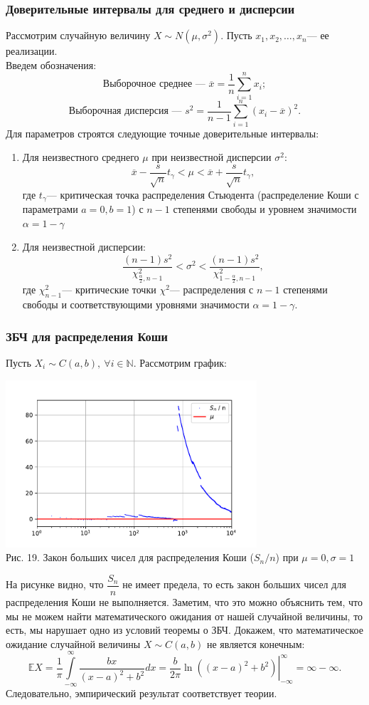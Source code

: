 \documentclass[11pt]{article}
\begin{document}
\subsubsection{Доверительные интервалы для среднего и дисперсии}
Рассмотрим случайную величину $X \sim N(\mu,\sigma^2).$ Пусть $x_1,x_2,\dots,x_n$--- ее реализации.\\
Введем обозначения:
\[ \textbf{Выборочное среднее --- } \overline{x} = \frac{1}{n}\sum_{i = 1}^{n}x_i ;\]
\[ \textbf{Выборочная дисперсия --- } s^2 = \frac{1}{n - 1}\sum_{i = 1}^{n}(x_i - \overline{x})^2.\]
Для параметров строятся следующие точные доверительные интервалы:
\begin{enumerate}
	\item Для неизвестного среднего $\mu$ при неизвестной дисперсии $\sigma^2$:
	\[ \overline{x} - \frac{s}{\sqrt{n}}t_\gamma < \mu < \overline{x} + \frac{s}{\sqrt{n}}t_\gamma, \]
	где $t_\gamma$--- критическая точка распределения Стьюдента (распределение Коши с параметрами $a = 0, b = 1$) с $n - 1$ степенями свободы и уровнем значимости $\alpha = 1 - \gamma$
	\item Для неизвестной дисперсии:
	\[ \frac{(n - 1)s^2}{\chi^2_{\frac{\alpha}{2},n-1}} < \sigma^2 < \frac{(n - 1)s^2}{\chi^2_{1 - \frac{\alpha}{2},n-1}},  \]
	где $\chi^2_{n-1}$--- критические точки $\chi^2$--- распределения с $n - 1$ степенями свободы и соответствующими уровнями значимости $\alpha = 1 - \gamma.$
\end{enumerate}	
\subsubsection{ЗБЧ для распределения Коши}

Пусть $X_i\sim C(a,b),\ \forall i\in\mathbb{N}$. Рассмотрим график:
\begin{center}
	\includegraphics[width=0.7\textwidth]{5_1.pdf}\\
	{Рис. 19. Закон больших чисел для распределения Коши ($S_n / n$) при $\mu = 0, \sigma = 1$ }
\end{center}
На рисунке видно, что $\dfrac{S_n}{n}$ не имеет предела, то есть закон больших чисел для распределения Коши не выполняется. Заметим, что это можно объяснить тем, что мы не можем найти математического ожидания от нашей случайной величины, то есть, мы нарушает одно из условий теоремы о ЗБЧ. Докажем, что математическое ожидание случайной величины $X\sim C(a,b)$ не является конечным:
$$
\mathbb{E} X=\dfrac{1}{\pi}\int\limits_{-\infty}^{\infty} \dfrac{bx}{(x-a)^2+b^2}dx=\left.\dfrac{b}{2\pi}\ln((x-a)^2+b^2)\right|_{-\infty}^{\infty}=\infty-\infty.
$$
Следовательно, эмпирический результат соответствует теории.
\end{document}
